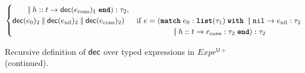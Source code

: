 \begin{figure}
\begin{align*}
\begin{cases}
			\qquad \boldsymbol{\mid} h::t \rightarrow \mathsf{dec}(e_{\textnormal{cons}})_1\; {\textnormal{\ttfamily\bfseries end}}) : \tau_2, \\
			\mathsf{dec}(e_0)_2 \mathbin{\|} \mathsf{dec}(e_{\textnormal{nil}})_2
			\mathbin{\|} \mathsf{dec}(e_{\textnormal{cons}})_2)
                & \text{if } e = (\textnormal{\ttfamily\bfseries match}\; e_0 : \textnormal{\ttfamily\bfseries list}(\tau_1)\; \textnormal{\ttfamily\bfseries with}\; \boldsymbol{\mid} \textnormal{\ttfamily nil} \rightarrow e_{\textnormal{nil}} : \tau_2 \\
                &\qquad\qquad\;\;\;\boldsymbol{\mid} h::t \rightarrow e_{\textnormal{cons}} : \tau_2\; {\textnormal{\ttfamily\bfseries end}}) : \tau_2
		\end{cases}
	\end{align*}
	\caption{Recursive definition of $\mathsf{dec}$ over typed expressions in $Expr^{\mathsf U+}$ (continued).}
	\label{fig:decompose-definition-2}
\end{figure}

